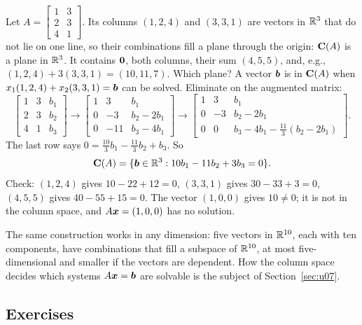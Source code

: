 \begin{example}\label{ex:u06-colspace}
Let $A=\begin{bmatrix} 1&3\\ 2&3\\ 4&1\end{bmatrix}$. Its columns $(1,2,4)$ and $(3,3,1)$ are
vectors in $\mathbb{R}^3$ that do not lie on one line, so their combinations fill a plane through the
origin: $\mathbf{C}(A)$ is a plane in $\mathbb{R}^3$. It contains $\boldsymbol{0}$, both columns, their sum
$(4,5,5)$, and, e.g., $(1,2,4)+3(3,3,1)=(10,11,7)$. Which plane? A vector $\boldsymbol{b}$ is in
$\mathbf{C}(A)$ when $x_1(1,2,4)+x_2(3,3,1)=\boldsymbol{b}$ can be solved. Eliminate on the augmented matrix:
\[
  \left[\begin{array}{rr|l} 1&3&b_1\\ 2&3&b_2\\ 4&1&b_3\end{array}\right]
  \to
  \left[\begin{array}{rr|l} 1&3&b_1\\ 0&-3&b_2-2b_1\\ 0&-11&b_3-4b_1\end{array}\right]
  \to
  \left[\begin{array}{rr|l} 1&3&b_1\\ 0&-3&b_2-2b_1\\ 0&0&b_3-4b_1-\tfrac{11}{3}(b_2-2b_1)\end{array}\right].
\]
The last row says $0=\tfrac{10}{3}b_1-\tfrac{11}{3}b_2+b_3$. So
\[
  \mathbf{C}(A)=\{\boldsymbol{b}\in\mathbb{R}^3: 10b_1-11b_2+3b_3=0\}.
\]
Check: $(1,2,4)$ gives $10-22+12=0$, $(3,3,1)$ gives $30-33+3=0$, $(4,5,5)$ gives
$40-55+15=0$. The vector $(1,0,0)$ gives $10\neq0$; it is not in the column space, and
$A\boldsymbol{x}=(1,0,0)$ has no solution.
\end{example}

The same construction works in any dimension: five vectors in $\mathbb{R}^{10}$, each with ten
components, have combinations that fill a subspace of $\mathbb{R}^{10}$, at most five-dimensional and
smaller if the vectors are dependent. How the column space decides which systems
$A\boldsymbol{x}=\boldsymbol{b}$ are solvable is the subject of Section~\ref{sec:u07}.

\subsection{Exercises}

